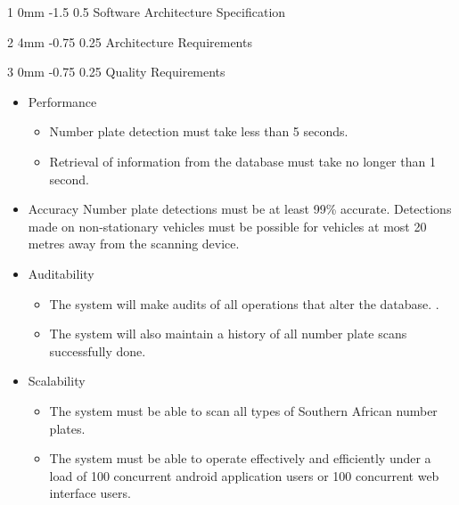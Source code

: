 \documentclass[12pt]{article}
\makeatletter
\renewcommand{\section}{\@startsection
   {section}%
   {1}%
   {0mm}%
   {-1.5\baselineskip}%
   {0.5\baselineskip}%
   {\sffamily\bfseries\upshape\normalsize}}%
\renewcommand{\subsection}{\@startsection
   {subsection}%
   {2}%
   {4mm}%
   {-0.75\baselineskip}%
   {0.25\baselineskip}%
   {\rmfamily\normalfont\scshape\normalsize}}%
\renewcommand{\subsubsection}{\@startsection
   {subsubsection}%
   {3}%
   {0mm}%
   {-0.75\baselineskip}%
   {0.25\baselineskip}%
   {\rmfamily\normalfont\slshape\normalsize}}%
\makeatother
\begin{document}
                \section{Software Architecture Specification}
                
               		 \subsection{Architecture Requirements}
               		   
                			\subsubsection{Quality Requirements}
                					\begin{itemize}
                							\item Performance
	                								\begin{itemize}
						   			                  		\item Number plate detection must take less than 5 seconds.
						   			                  		\item Retrieval of information from the database must take no longer than 1 second.
						   			                \end{itemize}
                								
                							\item Accuracy
			              							Number plate detections must be at least 99\% accurate. Detections made on non-stationary vehicles must be possible for vehicles at most 20 metres away from the scanning device.
               								
                							\item Auditability
		               								\begin{itemize}
		               									\item The system will make audits of all operations that alter the database. .
		               									\item The system will also maintain a history of all number plate scans successfully done.
		               								\end{itemize}
		               								
		               								
                							\item Scalability
                									\begin{itemize}
					       				                  	\item The system must be able to scan all types of Southern African number plates.
					       				                  	\item The system must be able to operate effectively and efficiently under a load of 100 concurrent android application users or 100 concurrent web interface users.
					       			                \end{itemize}
		               								

\end{itemize}
\end{document}
